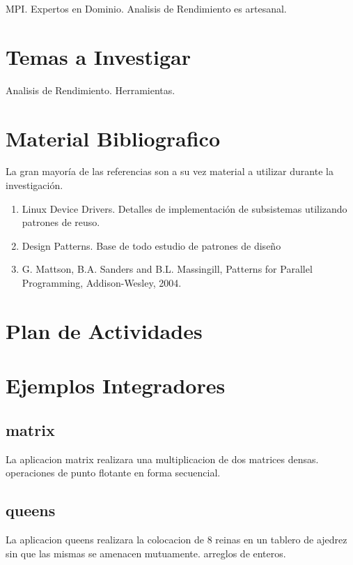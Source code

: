 \documentclass[a4paper,twocolumn]{article}
\begin{document}
MPI.
Expertos en Dominio.
Analisis de Rendimiento es artesanal.

\section{Temas a Investigar}

Analisis de Rendimiento.
Herramientas.

\section{Material Bibliografico}

La gran mayor\'ia de las referencias son a su vez material a utilizar durante la investigaci\'on.

\begin{enumerate}
\item{Linux Device Drivers}. Detalles de implementaci\'on de subsistemas utilizando patrones de reuso.
\item{Design Patterns}. Base de todo estudio de patrones de dise\~no
\item{G. Mattson, B.A. Sanders and B.L. Massingill, Patterns for Parallel Programming, Addison-Wesley, 2004}.
\end{enumerate}

\section{Plan de Actividades}

\appendix

\section{Ejemplos Integradores}

\subsection{matrix}

La aplicacion matrix realizara una multiplicacion de dos matrices densas.
operaciones de punto flotante en forma secuencial.

\subsection{queens}

La aplicacion queens realizara la colocacion de 8 reinas en un tablero de ajedrez sin que las mismas se amenacen mutuamente.
arreglos de enteros.
\end{document}
